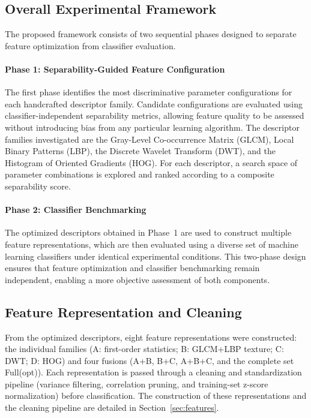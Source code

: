\subsection{Overall Experimental Framework}
\label{sec:framework}

The proposed framework consists of two sequential phases designed to separate
feature optimization from classifier evaluation.

\paragraph{Phase 1: Separability-Guided Feature Configuration}
The first phase identifies the most discriminative parameter configurations for
each handcrafted descriptor family. Candidate configurations are evaluated using
classifier-independent separability metrics, allowing feature quality to be
assessed without introducing bias from any particular learning algorithm. The
descriptor families investigated are the Gray-Level Co-occurrence Matrix (GLCM),
Local Binary Patterns (LBP), the Discrete Wavelet Transform (DWT), and the
Histogram of Oriented Gradients (HOG). For each descriptor, a search space of
parameter combinations is explored and ranked according to a composite
separability score.

\paragraph{Phase 2: Classifier Benchmarking}
The optimized descriptors obtained in Phase~1 are used to construct multiple
feature representations, which are then evaluated using a diverse set of machine
learning classifiers under identical experimental conditions. This two-phase
design ensures that feature optimization and classifier benchmarking remain
independent, enabling a more objective assessment of both components.

\subsection{Feature Representation and Cleaning}
\label{sec:feat_design}

From the optimized descriptors, eight feature representations were constructed:
the individual families (A: first-order statistics; B: GLCM+LBP texture;
C: DWT; D: HOG) and four fusions (A+B, B+C, A+B+C, and the complete set
Full(opt)). Each representation is passed through a cleaning and standardization
pipeline (variance filtering, correlation pruning, and training-set z-score
normalization) before classification. The construction of these representations
and the cleaning pipeline are detailed in Section~\ref{sec:features}.

